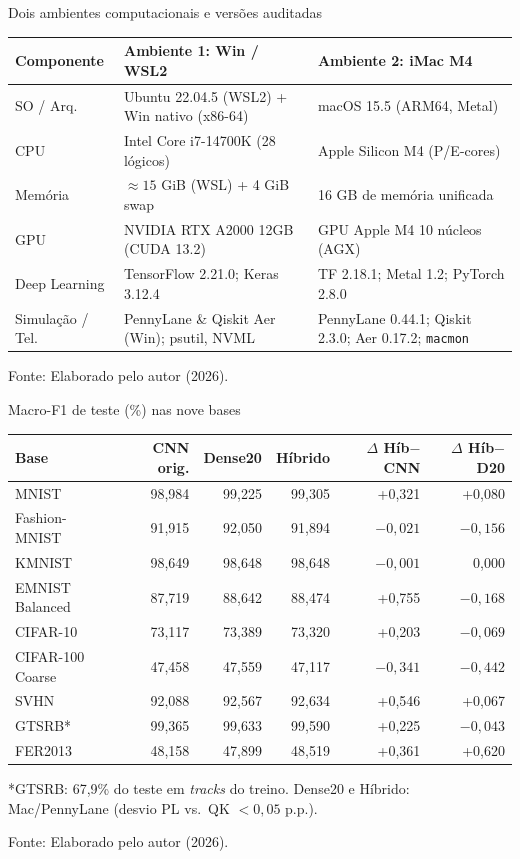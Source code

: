 \documentclass[aspectratio=169,11pt,brazil]{beamer}
\newcommand{\fonte}[1]{\par\vfill{\footnotesize\color{textmuted}Fonte: #1\par}}
\begin{document}
\begin{frame}{Dois ambientes computacionais e versões auditadas}
  \centering
  {\footnotesize
  \begin{tabular}{@{}lR{5.2cm}R{5.2cm}@{}}
    \toprule
    \textbf{Componente} & \textbf{Ambiente 1: Win / WSL2} & \textbf{Ambiente 2: iMac M4} \\
    \midrule
    SO / Arq. & Ubuntu 22.04.5 (WSL2) + Win nativo (x86-64) & macOS 15.5 (ARM64, Metal) \\
    CPU & Intel Core i7-14700K (28 lógicos) & Apple Silicon M4 (P/E-cores) \\
    Memória & $\approx 15$ GiB (WSL) + 4 GiB swap & 16 GB de memória unificada \\
    GPU & NVIDIA RTX A2000 12GB (CUDA 13.2) & GPU Apple M4 10 núcleos (AGX) \\
    Deep Learning & TensorFlow 2.21.0; Keras 3.12.4 & TF 2.18.1; Metal 1.2; PyTorch 2.8.0 \\
    Simulação / Tel. & PennyLane \& Qiskit Aer (Win); psutil, NVML & PennyLane 0.44.1; Qiskit 2.3.0; Aer 0.17.2; \texttt{macmon} \\
    \bottomrule
  \end{tabular}}
  \fonte{Elaborado pelo autor (2026).}
\end{frame}

\begin{frame}{Macro-F1 de teste (\%) nas nove bases}
  \centering
  {\footnotesize
  \begin{tabular}{@{}lrrrrr@{}}
    \toprule
    \textbf{Base} & \textbf{CNN orig.} & \textbf{Dense20} & \textbf{Híbrido} & \textbf{$\Delta$ Híb$-$CNN} & \textbf{$\Delta$ Híb$-$D20} \\
    \midrule
    MNIST & 98,984 & 99,225 & 99,305 & +0,321 & +0,080 \\
    Fashion-MNIST & 91,915 & 92,050 & 91,894 & $-0{,}021$ & $-0{,}156$ \\
    KMNIST & 98,649 & 98,648 & 98,648 & $-0{,}001$ & 0,000 \\
    EMNIST Balanced & 87,719 & 88,642 & 88,474 & +0,755 & $-0{,}168$ \\
    CIFAR-10 & 73,117 & 73,389 & 73,320 & +0,203 & $-0{,}069$ \\
    CIFAR-100 Coarse & 47,458 & 47,559 & 47,117 & $-0{,}341$ & $-0{,}442$ \\
    SVHN & 92,088 & 92,567 & 92,634 & +0,546 & +0,067 \\
    GTSRB* & 99,365 & 99,633 & 99,590 & +0,225 & $-0{,}043$ \\
    FER2013 & 48,158 & 47,899 & 48,519 & +0,361 & +0,620 \\
    \bottomrule
  \end{tabular}}
  \vspace{0.15cm}
  {\footnotesize\color{textmuted}*GTSRB: 67,9\% do teste em \textit{tracks} do treino. Dense20 e Híbrido: Mac/PennyLane (desvio PL vs.\ QK $< 0{,}05$ p.p.).}
  \fonte{Elaborado pelo autor (2026).}
\end{frame}
\end{document}
